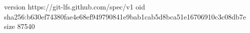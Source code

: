 version https://git-lfs.github.com/spec/v1
oid sha256:b630ef74380fae4e68ef949790841e9bab1cab5d8bca51e16706910c3c08db7e
size 87540

